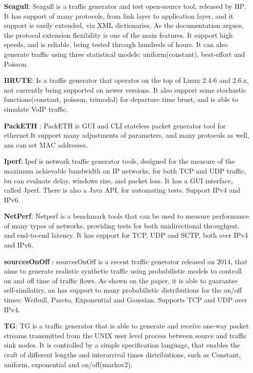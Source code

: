 \textbf{Seagull}\cite{wp-seagull}\cite{web-seagull}: Seagull is a traffic generator and test open-source tool, released by HP. It has support of many protocols, from link layer to application layer, and it support is easily extended, via XML dictionaries. As the documentation argues, the protocol extension flexibility is one of the main features. It support high speeds, and is reliable, being tested through hundreds of hours. It can also generate traffic using three statistical models: uniform(constant), best-effort and Poisson.


\textbf{BRUTE}\cite{web-brute}: Is a traffic generator that operates on the top of  Linux 2.4-6 and 2.6.x, not currently being supported on newer versions. It also support some stochastic functions(constant, poisson, trimodal) for departure time brust, and is able to simulate VoIP traffic. 

\textbf{PackETH} \cite{web-packeth}: PackETH is GUI and CLI stateless packet generator tool for ethernet.It support many adjustments of parameters, and many protocols as well, ans can set MAC addresses.


\textbf{Iperf}\cite{web-iperf}: Ipef is network traffic generator tools, designed for the measure of the maximum achievable bandwidth on IP networks, for both TCP and UDP traffic, bu can evaluate delay, windows size, and packet loss. It has a GUI interface, called Jperf\cite{web-jperf}. There is also a Java API, for automating tests\cite{jperf-git}. Support IPv4 and IPv6.


\textbf{NetPerf}\cite{web-netperf}: Netperf is a benchmark tools that can be used to measure performance of many types of networks, providing tests for both unidirectional throughput, and end-to-end latency. It has support for TCP, UDP and SCTP, both over IPv4 and IPv6.


\textbf{sourcesOnOff}\cite{sourcesonoff-paper} \cite{web-sourcesonoff}: sourcesOnOff is a recent traffic generator released on 2014, that aims to generate realistic synthetic traffic using probabilistic models to controll on and off time of traffic flows. As shown on the paper, it is able to guarantee self-similatiry, an has support to many probabilistic distributions for the on/off times: Weibull, Pareto, Exponential  and Gaussian. Supports TCP and UDP over IPv4. 


\textbf{TG}\cite{web-tg}: TG is a traffic generator that is able to generate and receive one-way packet streams transmitted from the UNIX user level process between source and traffic sink nodes. It is controlled by a simple specification language, that enables the craft of different lengths and interarrival times distributions, such as Constant, uniform, exponential and on/off(markov2).



